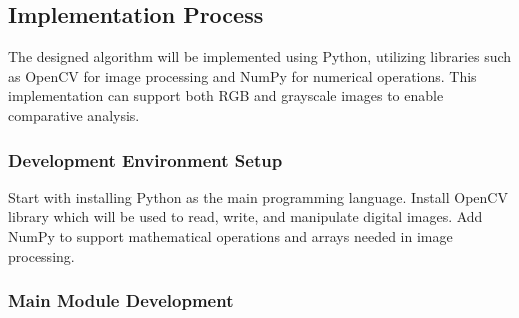 \documentclass{ittelkom}
\begin{document}
\subsection{Implementation Process}

The designed algorithm will be implemented using Python, utilizing libraries
such as OpenCV for image processing and NumPy for numerical operations. This
implementation can support both RGB and grayscale images to enable comparative
analysis.

\subsubsection{Development Environment Setup}

Start with installing Python as the main programming language. Install OpenCV
library which will be used to read, write, and manipulate digital images. Add
NumPy to support mathematical operations and arrays needed in image processing.

\subsubsection{Main Module Development}
\end{document}

